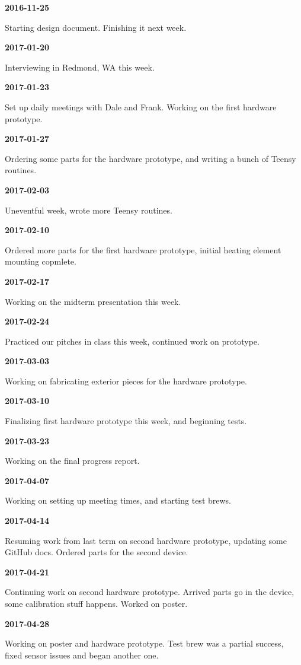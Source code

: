 \textbf{2016-11-25}

Starting design document. Finishing it next week.

\textbf{2017-01-20}

Interviewing in Redmond, WA this week.

\textbf{2017-01-23}

Set up daily meetings with Dale and Frank. Working on the first hardware prototype.

\textbf{2017-01-27}

Ordering some parts for the hardware prototype, and writing a bunch of Teensy routines.

\textbf{2017-02-03}

Uneventful week, wrote more Teensy routines.

\textbf{2017-02-10}

Ordered more parts for the first hardware prototype, initial heating element mounting copmlete.

\textbf{2017-02-17}

Working on the midterm presentation this week.

\textbf{2017-02-24}

Practiced our pitches in class this week, continued work on prototype.

\textbf{2017-03-03}

Working on fabricating exterior pieces for the hardware prototype.

\textbf{2017-03-10}

Finalizing first hardware prototype this week, and beginning tests.

\textbf{2017-03-23}

Working on the final progress report.

\textbf{2017-04-07}

Working on setting up meeting times, and starting test brews.

\textbf{2017-04-14}

Resuming work from last term on second hardware prototype, updating some GitHub docs. Ordered parts for the second device.

\textbf{2017-04-21}

Continuing work on second hardware prototype. Arrived parts go in the device, some calibration stuff happens. Worked on poster.

\textbf{2017-04-28}

Working on poster and hardware prototype. Test brew was a partial success, fixed sensor issues and began another one.


